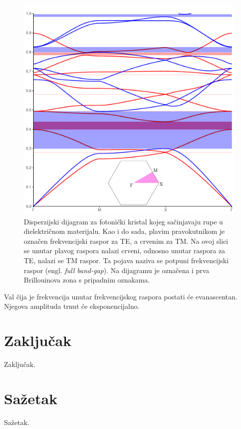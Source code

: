 \documentclass[utf8, seminar]{fer}
\begin{document}
\begin{figure}[ht]
	\centering
	\includegraphics[width = 1.0\linewidth]{./images/triangular_holes.pdf}
	\caption{Disperzijski dijagram za fotonički kristal kojeg sačinjavaju rupe
	u dielektričnom materijalu. Kao i do sada, plavim pravokutnikom je označen
	frekvencijski raspor za TE, a crvenim za TM. Na ovoj slici se unutar plavog
	raspora nalazi crveni, odnosno unutar raspora za TE, nalazi se TM raspor. Ta
	pojava naziva se potpuni frekvencijski raspor (engl. \textit{full band-gap}).
	Na dijagramu je označena i prva Brillouinova zona s pripadnim oznakama.}
	\label{fig:triangular_full_band}
\end{figure}

Val čija je frekvencija unutar frekvencijskog
raspora postati će evanascentan. Njegova amplituda trnut će eksponencijalno.


\chapter{Zaključak}
Zaključak.



\nocite{*}

\chapter{Sažetak}
Sažetak.
\end{document}

